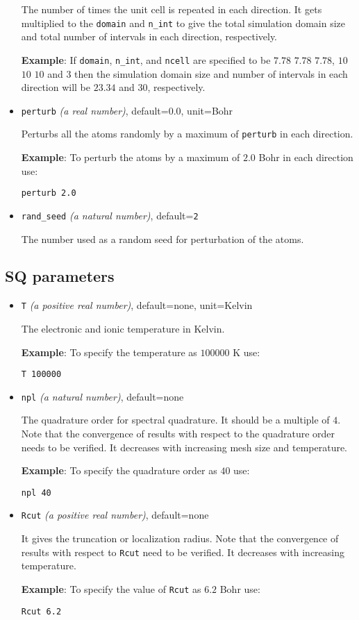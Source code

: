 \documentclass[12pt]{report}
\begin{document}
\begin{itemize}
The number of times the unit cell is repeated in each direction. It gets multiplied to the \texttt{domain} and \texttt{n\_int} to give the total simulation domain size and total number of intervals in each direction, respectively. 

{\bf{Example}}: If \texttt{domain}, \texttt{n\_int}, and \texttt{ncell} are specified to be $ 7.78 $ $7.78$ $7.78$, $10$ $10$ $10$ and $3$ then the simulation domain size and number of intervals in each direction will be $23.34$ and $30$, respectively.

\item \texttt{perturb} {\it{(a real number)}}, default=0.0, unit=Bohr

Perturbs all the atoms randomly by a maximum of {\texttt{perturb}} in each direction.

{\bf{Example}}: To perturb the atoms by a maximum of $2.0$ Bohr in each direction use:

\texttt{perturb 2.0}

\item\texttt{rand\_seed} {\it{(a natural number)}}, default=\texttt{2}

The number used as a random seed for perturbation of the atoms.

\end{itemize}
\subsection{SQ parameters}
\begin{itemize}

\item\texttt{T} {\it{(a positive real number)}}, default=none, unit=Kelvin

The electronic and ionic temperature in Kelvin. 

{\bf{Example}}: To specify the temperature as $100000$ K use:

\texttt{T 100000}

\item\texttt{npl} {\it{(a natural number)}}, default=none

The quadrature order for spectral quadrature. It should be a multiple of $4$. Note that the convergence of results with respect to the quadrature order needs to be verified. It decreases with increasing mesh size and temperature.

{\bf{Example}}: To specify the quadrature order as $40$ use:

\texttt{npl 40}


\item\texttt{Rcut} {\it{(a positive real number)}}, default=none

It gives the truncation or localization radius. Note that the convergence of results with respect to {\texttt{Rcut}} need to be verified. It decreases with increasing temperature. 

{\bf{Example}}: To specify the value of \texttt{Rcut} as $6.2$ Bohr use:

\texttt{Rcut 6.2}

\end{itemize}
\end{document}
